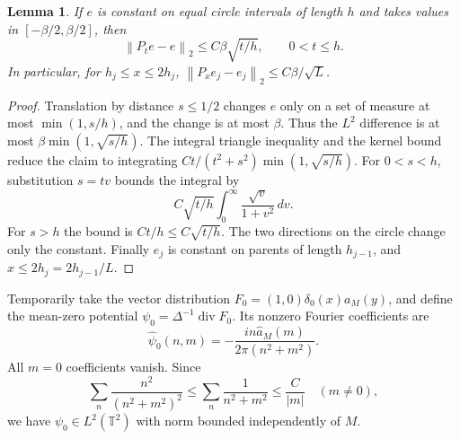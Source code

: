 \documentclass[11pt]{article}
\newtheorem{lemma}{Lemma}
\newcommand{\T}{\mathbb T}
\newcommand{\norm}[1]{\left\lVert#1\right\rVert}
\DeclareMathOperator{\diver}{div}
\begin{document}
\begin{lemma}\label{lem:poisson}
If $e$ is constant on equal circle intervals of length $h$ and takes
values in $[-\beta/2,\beta/2]$, then
\[
 \norm{P_te-e}_2\leq C\beta\sqrt{t/h},\qquad 0<t\leq h.
\]
In particular, for $h_j\leq x\leq2h_j$,
$\norm{P_xe_j-e_j}_2\leq C\beta/\sqrt L$.
\end{lemma}
\begin{proof}
Translation by distance $s\leq1/2$ changes $e$ only on a set of measure
at most $\min(1,s/h)$, and the change is at most $\beta$. Thus the
$L^2$ difference is at most $\beta\min(1,\sqrt{s/h})$.
The integral triangle inequality and the kernel bound reduce the claim
to integrating $Ct/(t^2+s^2)\min(1,\sqrt{s/h})$.
For $0<s<h$, substitution $s=tv$ bounds the integral by
\[
 C\sqrt{t/h}\int_0^\infty\frac{\sqrt v}{1+v^2}\,dv.
\]
For $s>h$ the bound is $Ct/h\leq C\sqrt{t/h}$.
The two directions on the circle change only the constant.
Finally $e_j$ is constant on parents of length $h_{j-1}$, and
$x\leq2h_j=2h_{j-1}/L$.
\end{proof}

Temporarily take the vector distribution
$F_0=(1,0)\delta_0(x)a_M(y)$, and define the mean-zero potential
$\psi_0=\Delta^{-1}\diver F_0$. Its nonzero Fourier coefficients are
\begin{equation}\label{eq:sheetfourier}
 \widehat\psi_0(n,m)=-\frac{in\widehat a_M(m)}{2\pi(n^2+m^2)}.
\end{equation}
All $m=0$ coefficients vanish. Since
\[
 \sum_n\frac{n^2}{(n^2+m^2)^2}
       \leq\sum_n\frac1{n^2+m^2}\leq\frac C{|m|}\quad(m\ne0),
\]
we have $\psi_0\in L^2(\T^2)$ with norm bounded independently of $M$.
\end{document}

